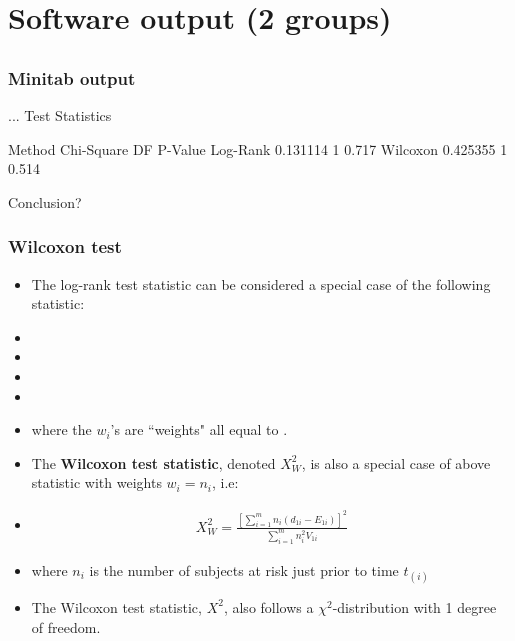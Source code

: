 \section[Software output (2 groups)]{Software output (2 groups)}
\subsection{}
\begin{frame}
\end{frame}

\begin{frame}[fragile]
\frametitle{Minitab output}
\begin{MTout}{.3}
    ...
    Test Statistics

    Method    Chi-Square  DF  P-Value
    Log-Rank    0.131114   1    0.717
    Wilcoxon    0.425355   1    0.514
\end{MTout}
Conclusion?
\vskip300pt
\end{frame}

\begin{frame}
\frametitle{Wilcoxon test}
\begin{itemize}
\item The log-rank test statistic can be considered a special case of the following statistic:
\item[]
\item[]
\item[]
\item[]
\item[] where the $w_i$'s are ``weights" all equal to \underline{\hspace{0.5in}}. %
\item The \textbf{Wilcoxon test statistic}, denoted $X_W^2$, is also a special case of above statistic with  weights $w_i = n_i$, i.e:
\item[]
   \begin{eqnarray}
    X_W^2=\frac{\left[\sum_{i=1}^mn_i( d_{1i}-E_{1i})\right]^2}{\sum_{i=1}^m n_i^2{V}_{1i}}  \nonumber
    \end{eqnarray}
\item[] where $n_i$ is the number of subjects at risk just prior to time $t_{(i)}$
\item The {Wilcoxon test statistic}, $X^2$, also follows a $\chi^2$-distribution with 1 degree of freedom.
\end{itemize}
\end{frame}

